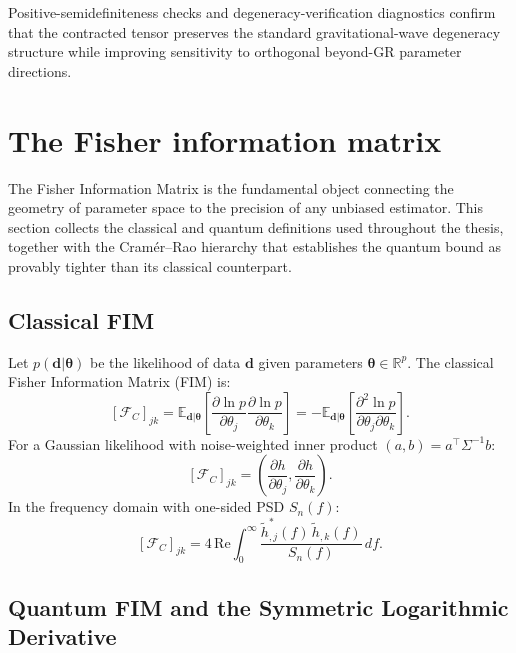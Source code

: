 \documentclass[11pt,a4paper, english]{book}
\theoremstyle{plain}
\theoremstyle{definition}
\numberwithin{equation}{chapter}
\numberwithin{figure}{chapter}
\numberwithin{table}{chapter}
\begin{document}
Positive-semidefiniteness checks and degeneracy-verification diagnostics
confirm that the contracted tensor preserves the standard
gravitational-wave degeneracy structure while improving sensitivity to
orthogonal beyond-GR parameter directions.

\section{The Fisher information matrix}
\label{app:fim}
The Fisher Information Matrix is the fundamental object connecting the
geometry of parameter space to the precision of any unbiased estimator.
This section collects the classical and quantum definitions used throughout
the thesis, together with the Cram\'{e}r--Rao hierarchy that establishes
the quantum bound as provably tighter than its classical counterpart.
\subsection{Classical FIM}
\label{app:cfim}
Let $p(\mathbf{d}|\boldsymbol{\theta})$ be the likelihood of data
$\mathbf{d}$ given parameters $\boldsymbol{\theta}\in\mathbb{R}^p$.
The classical Fisher Information Matrix (FIM) is:
\begin{equation}
  \label{eq:cfim_def}
  [\mathcal{F}_C]_{jk} = \mathbb{E}_{\mathbf{d}|\boldsymbol{\theta}}\!\left[
    \frac{\partial\ln p}{\partial\theta_j}
    \frac{\partial\ln p}{\partial\theta_k}
  \right]
  = -\mathbb{E}_{\mathbf{d}|\boldsymbol{\theta}}\!\left[
    \frac{\partial^2\ln p}{\partial\theta_j\partial\theta_k}
  \right].
\end{equation}
For a Gaussian likelihood with noise-weighted inner product
$(a,b)=a^\top\Sigma^{-1}b$:
\begin{equation}
  \label{eq:cfim_gaussian}
  [\mathcal{F}_C]_{jk} = \left(
    \frac{\partial h}{\partial\theta_j},
    \frac{\partial h}{\partial\theta_k}
  \right).
\end{equation}
In the frequency domain with one-sided PSD $S_n(f)$:
\begin{equation}
  \label{eq:cfim_freq}
  [\mathcal{F}_C]_{jk} = 4\,\mathrm{Re}
    \int_0^\infty \frac{\tilde{h}_{,j}^*(f)\,\tilde{h}_{,k}(f)}{S_n(f)}\,df.
\end{equation}

\subsection{Quantum FIM and the Symmetric Logarithmic Derivative}
\label{app:qfim}
\end{document}
